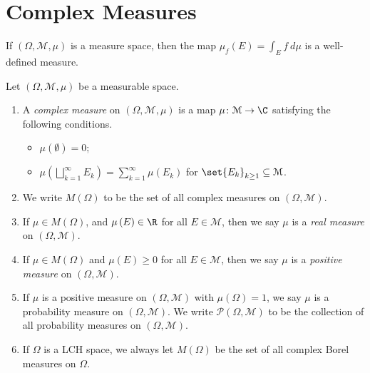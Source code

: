 \section{Complex Measures}%
\begin{example}
  If $\left(\Omega,\mathcal{M},\mu\right)$ is a measure space, then the map $\mu_f(E) = \int_{E}^{} f\:d\mu$ is a well-defined measure.
\end{example}
\begin{definition}
  Let $\left(\Omega,\mathcal{M},\mu\right)$ be a measurable space.
  \begin{enumerate}[(1)]
    \item A \textit{complex measure} on $\left(\Omega,\mathcal{M},\mu\right)$ is a map $\mu\colon \mathcal{M}\rightarrow \C$ satisfying the following conditions.
      \begin{itemize}
        \item $\mu\left(\emptyset\right) = 0$;
        \item $\displaystyle \mu\left(\bigsqcup_{k=1}^{\infty}E_k\right) = \sum_{k=1}^{\infty}\mu\left(E_k\right)$ for $\set{E_k}_{k\geq 1}\subseteq \mathcal{M}$.
      \end{itemize}
    \item We write $M\left(\Omega\right)$ to be the set of all complex measures on $\left(\Omega,\mathcal{M}\right)$.
    \item If $\mu\in M\left(\Omega\right)$, and $\mu\left(E\right)\in \R$ for all $E\in \mathcal{M}$, then we say $\mu$ is a \textit{real measure} on $\left(\Omega,\mathcal{M}\right)$.
    \item If $\mu\in M\left(\Omega\right)$ and $\mu(E) \geq 0$ for all $E\in \mathcal{M}$, then we say $\mu$ is a \textit{positive measure} on $\left(\Omega,\mathcal{M}\right)$.
    \item If $\mu$ is a positive measure on $\left(\Omega,\mathcal{M}\right)$ with $\mu\left(\Omega\right) = 1$, we say $\mu$ is a probability measure on $\left(\Omega,\mathcal{M}\right)$. We write $\mathcal{P}\left(\Omega,\mathcal{M}\right)$ to be the collection of all probability measures on $\left(\Omega,\mathcal{M}\right)$.
    \item If $\Omega$ is a LCH space, we always let $M\left(\Omega\right)$ be the set of all complex Borel measures on $\Omega$.
  \end{enumerate}
\end{definition}
